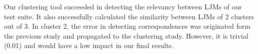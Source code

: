 Our clustering tool succeeded in detecting the relevancy between LJMs of our test suite. It also successfully calculated the similarity between LJMs of 2 clusters out of 3. In cluster 2, the error in detecting correspondences was originated form the previous study and propagated to the clustering study. However, it is trivial (0.01) and would have a low impact in our final results.

